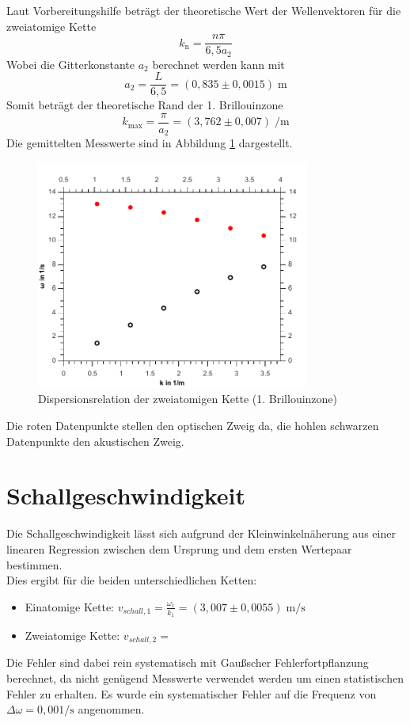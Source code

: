Laut Vorbereitungshilfe beträgt der theoretische Wert der Wellenvektoren für die zweiatomige Kette
\begin{equation}
	 k_{\textrm{n}} = \frac{n\pi}{6,5a_2}
\end{equation}
Wobei die Gitterkonstante $a_2$ berechnet werden kann mit
\begin{equation}
	a_2 = \frac{L}{6,5} = (0,835 \pm 0,0015)\;\si{\meter}
\end{equation}
Somit beträgt der theoretische Rand der 1. Brillouinzone
\begin{equation}
	k_{\textrm{max}} = \frac{\pi}{a_2} = (3,762 \pm 0,007)\;\si{\per\meter}
\end{equation}
Die gemittelten Messwerte sind in Abbildung \ref{fig:a1_two} dargestellt.
\begin{figure}[h]
	\centering\includegraphics[width=0.8\textwidth]{fig/a1_two}
	\caption{Dispersionsrelation der zweiatomigen Kette (1. Brillouinzone)}
	\label{fig:a1_two}
\end{figure}
Die roten Datenpunkte stellen den optischen Zweig da, die hohlen schwarzen Datenpunkte den akustischen Zweig.

\section{Schallgeschwindigkeit}

Die Schallgeschwindigkeit lässt sich aufgrund der Kleinwinkelnäherung aus einer linearen Regression zwischen dem Ursprung und dem ersten Wertepaar bestimmen.\\
Dies ergibt für die beiden unterschiedlichen Ketten:
\begin{itemize}
	\item Einatomige Kette: $v_{schall,1} = \frac{\omega_1}{k_1} = (3,007 \pm 0,0055)\;\si{\meter\per\second}$\\
	\item Zweiatomige Kette: $v_{schall,2} = $
\end{itemize}
Die Fehler sind dabei rein systematisch mit Gaußscher Fehlerfortpflanzung berechnet, da nicht genügend Messwerte verwendet werden um einen statistischen Fehler zu erhalten. Es wurde ein systematischer Fehler auf die Frequenz von $\Delta\omega = 0,001 \si{\per\second}$ angenommen.

